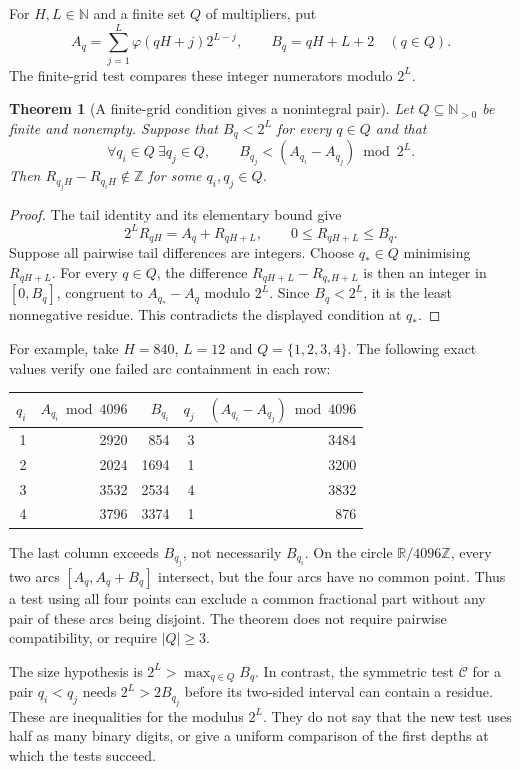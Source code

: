 \documentclass[11pt]{article}
\theoremstyle{plain}
\newtheorem{thm}{Theorem}[section]
\theoremstyle{definition}
\theoremstyle{remark}
\begin{document}
For $H,L\in\mathbb N$ and a finite set $Q$ of multipliers, put
\[
 A_q=\sum_{j=1}^{L}\varphi(qH+j)2^{L-j},\qquad
 B_q=qH+L+2\quad(q\in Q).
\]
The finite-grid test compares these integer numerators modulo $2^L$.

\begin{thm}[A finite-grid condition gives a nonintegral pair]\label{catalogue:cert:b10a}
Let $Q\subseteq\mathbb N_{>0}$ be finite and nonempty. Suppose that
$B_q<2^L$ for every $q\in Q$ and that
\[
 \forall q_i\in Q\ \exists q_j\in Q,\qquad
 B_{q_j}<(A_{q_i}-A_{q_j})\bmod2^L.
\]
Then $R_{q_jH}-R_{q_iH}\notin\mathbb Z$ for some $q_i,q_j\in Q$.
\end{thm}
\begin{proof}
The tail identity and its elementary bound give
\[
 2^LR_{qH}=A_q+R_{qH+L},\qquad 0\le R_{qH+L}\le B_q.
\]
Suppose all pairwise tail differences are integers. Choose $q_*\in Q$
minimising $R_{qH+L}$. For every $q\in Q$, the difference
$R_{qH+L}-R_{q_*H+L}$ is then an integer in $[0,B_q]$, congruent to
$A_{q_*}-A_q$ modulo $2^L$. Since $B_q<2^L$, it is the least
nonnegative residue. This contradicts the displayed condition at $q_*$.
\end{proof}

For example, take $H=840$, $L=12$ and $Q=\{1,2,3,4\}$.
The following exact values verify one failed arc containment in each row:
\begin{center}
\begin{tabular}{rrrrr}
$q_i$ & $A_{q_i}\bmod4096$ & $B_{q_i}$ & $q_j$ & $(A_{q_i}-A_{q_j})\bmod4096$\\
\hline
1 & 2920 & 854  & 3 & 3484\\
2 & 2024 & 1694 & 1 & 3200\\
3 & 3532 & 2534 & 4 & 3832\\
4 & 3796 & 3374 & 1 & 876
\end{tabular}
\end{center}
The last column exceeds $B_{q_j}$, not necessarily $B_{q_i}$.
On the circle $\mathbb R/4096\mathbb Z$, every two arcs
$[A_q,A_q+B_q]$ intersect, but the four arcs have no common point.
Thus a test using all four points can exclude a common fractional part
without any pair of these arcs being disjoint. The theorem does not
require pairwise compatibility, or require $|Q|\ge3$.

The size hypothesis is $2^L>\max_{q\in Q}B_q$. In contrast, the
symmetric test $\mathcal C$ for a pair $q_i<q_j$ needs
$2^L>2B_{q_j}$ before its two-sided interval can contain a residue.
These are inequalities for the modulus $2^L$. They do not say that the
new test uses half as many binary digits, or give a uniform comparison
of the first depths at which the tests succeed.
\end{document}
